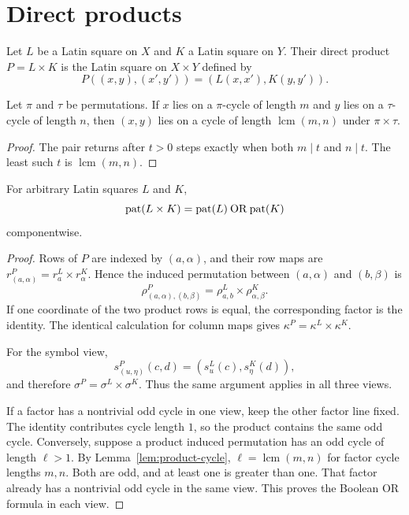 \section{Direct products}

Let $L$ be a Latin square on $X$ and $K$ a Latin square on $Y$.  Their direct
product $P=L\times K$ is the Latin square on $X\times Y$ defined by
\[
 P((x,y),(x',y'))=(L(x,x'),K(y,y')).
\]

\begin{lemma}\label{lem:product-cycle}
Let $\pi$ and $\tau$ be permutations.  If $x$ lies on a $\pi$-cycle of
length $m$ and $y$ lies on a $\tau$-cycle of length $n$, then $(x,y)$ lies on
a cycle of length $\operatorname{lcm}(m,n)$ under $\pi\times\tau$.
\end{lemma}

\begin{proof}
The pair returns after $t>0$ steps exactly when both $m\mid t$ and $n\mid t$.
The least such $t$ is $\operatorname{lcm}(m,n)$.
\end{proof}

\begin{theorem}\label{thm:pattern-product}
For arbitrary Latin squares $L$ and $K$,
\[
 \operatorname{pat}(L\times K)=\operatorname{pat}(L)\mathbin{\mathrm{OR}}\operatorname{pat}(K)
\]
componentwise.
\end{theorem}

\begin{proof}
Rows of $P$ are indexed by $(a,\alpha)$, and their row maps are
$r^P_{(a,\alpha)}=r^L_a\times r^K_\alpha$.  Hence the induced permutation
between $(a,\alpha)$ and $(b,\beta)$ is
\[
 \rho^P_{(a,\alpha),(b,\beta)}
   =\rho^L_{a,b}\times\rho^K_{\alpha,\beta}.
\]
If one coordinate of the two product rows is equal, the corresponding factor
is the identity.  The identical calculation for column maps gives
$\kappa^P=\kappa^L\times\kappa^K$.

For the symbol view,
\[
 s^P_{(u,\eta)}(c,d)=(s^L_u(c),s^K_\eta(d)),
\]
and therefore $\sigma^P=\sigma^L\times\sigma^K$.  Thus the same argument
applies in all three views.

If a factor has a nontrivial odd cycle in one view, keep the other factor line
fixed.  The identity contributes cycle length $1$, so the product contains
the same odd cycle.  Conversely, suppose a product induced permutation has
an odd cycle of length $\ell>1$.  By Lemma~\ref{lem:product-cycle},
$\ell=\operatorname{lcm}(m,n)$ for factor cycle lengths $m,n$.  Both are odd,
and at least one is greater than one.  That factor already has a nontrivial
odd cycle in the same view.  This proves the Boolean OR formula in each view.
\end{proof}

